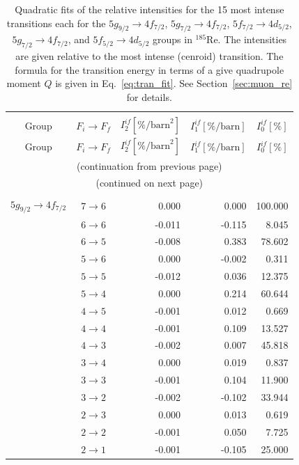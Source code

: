 \begin{longtable}{cc|rrr}
\caption{\label{tab:re185intens}%
Quadratic fits of the relative intensities for the 15 most intense transitions each for the $5g_{9/2}\rightarrow4f_{7/2}$, $5g_{7/2}\rightarrow4f_{7/2}$, $5f_{7/2}\rightarrow4d_{5/2}$, $5g_{7/2}\rightarrow4f_{7/2}$, and $5f_{5/2}\rightarrow4d_{5/2}$ groups in $^{185}$Re. The intensities are given relative to the most intense (cenroid) transition. The formula for the transition energy in terms of a give quadrupole moment $Q$ is given in Eq.~\eqref{eq:tran_fit}. See Section~\ref{sec:muon_re} for details.}\\
\hline\\[-10pt]\hline\\[-10pt]
\centering
Group& $F_i \rightarrow F_f$ & $I_2^{if} [\%\text{/barn}^2]$ & $I_1^{if} [\%\text{/barn}]$ & $I_0^{if} [\%]$\\[1pt]\hline\endfirsthead

Group& $F_i \rightarrow F_f$ & $I_2^{if} [\%\text{/barn}^2]$ & $I_1^{if} [\%\text{/barn}]$ & $I_0^{if} [\%]$\\[1pt]\hline
\multicolumn{5}{c}{{(continuation from previous page)}}\\
\endhead

\multicolumn{5}{c}{{(continued on next page)}}\\ \endfoot
\hline \\[-10pt] \hline
\endlastfoot
$5g_{9/2} \rightarrow 4f_{7/2}$  &  $7 \rightarrow 6$  &  0.000  &  0.000  &  100.000\\
&  $6 \rightarrow 6$  &  -0.011  &  -0.115  &  8.045\\
&  $6 \rightarrow 5$  &  -0.008  &  0.383  &  78.602\\
&  $5 \rightarrow 6$  &  0.000  &  -0.002  &  0.311\\
&  $5 \rightarrow 5$  &  -0.012  &  0.036  &  12.375\\
&  $5 \rightarrow 4$  &  0.000  &  0.214  &  60.644\\
&  $4 \rightarrow 5$  &  -0.001  &  0.012  &  0.669\\
&  $4 \rightarrow 4$  &  -0.001  &  0.109  &  13.527\\
&  $4 \rightarrow 3$  &  -0.002  &  0.007  &  45.818\\
&  $3 \rightarrow 4$  &  0.000  &  0.019  &  0.837\\
&  $3 \rightarrow 3$  &  -0.001  &  0.104  &  11.900\\
&  $3 \rightarrow 2$  &  -0.002  &  -0.102  &  33.944\\
&  $2 \rightarrow 3$  &  0.000  &  0.013  &  0.619\\
&  $2 \rightarrow 2$  &  -0.001  &  0.050  &  7.725\\
&  $2 \rightarrow 1$  &  -0.001  &  -0.105  &  25.000\\[7pt]


\end{longtable}
